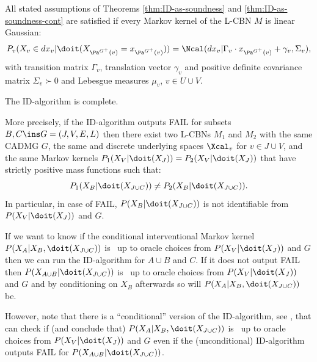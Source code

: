 \begin{Eg}
    All stated assumptions of Theorems \ref{thm:ID-as-soundness} and \ref{thm:ID-as-soundness-cont} 
    are satisfied if every Markov kernel of the L-CBN $M$ is linear Gaussian: 
    \[P_v(X_v \in dx_v|\doit(X_{\Pa^{G^+}(v)}=x_{\Pa^{G^+}(v)})) = \Ncal(dx_v|\Gamma_v \cdot x_{\Pa^{G^+}(v)} + \gamma_v, \Sigma_v), \] 
    with transition matrix $\Gamma_v$, translation vector $\gamma_v$ and positive definite covariance matrix $\Sigma_v \succ 0$ and Lebesgue measures $\mu_v$, $v \in U \cup V$.
\end{Eg}

\begin{Thm} 
    The ID-algorithm is complete.

    More precisely, if the ID-algorithm outputs FAIL for subsets $B, C \ins G=(J,V,E,L)$ 
    then there exist two L-CBNs $M_1$ and $M_2$ with the same \observational CADMG
    $G$, the same and discrete underlying spaces $\Xcal_v$ for $v \in J \cup V$, and the same 
    \observational Markov kernels $P_1(X_V|\doit(X_J)) =P_2(X_V|\doit(X_J))$ that have strictly positive mass functions such that:
    \[ P_1(X_B|\doit(X_{J \cup C})) \neq P_2(X_B|\doit(X_{J \cup C})). \]
    In particular, in case of FAIL, $P(X_B|\doit(X_{J \cup C}))$ is not identifiable from $P(X_V|\doit(X_J))$ and $G$.
\end{Thm}


\begin{Rem} 
    If we want to know if the conditional interventional Markov kernel $P(X_A|X_B,\doit(X_{J \cup C}))$
    is \trackable\ up to oracle choices from $P(X_V|\doit(X_J))$ and $G$ then we can run the ID-algorithm
    for $A \cup B$ and $C$. If it does not output FAIL then $P(X_{A \cup B}|\doit(X_{J \cup C}))$ 
    is \trackable\ up to oracle choices from $P(X_V|\doit(X_J))$ and $G$ and by conditioning on $X_B$ afterwards so will 
    $P(X_A|X_B,\doit(X_{J \cup C}))$ be.

    However, note that there is a ``conditional'' version of the ID-algorithm, see \cite{Tian04s}, 
    that can check if (and conclude that)
    $P(X_A|X_B,\doit(X_{J \cup C}))$ is \trackable\ up to oracle choices from $P(X_V|\doit(X_J))$ and $G$ 
    even if the (unconditional) ID-algorithm outputs FAIL for $P(X_{A \cup B}|\doit(X_{J \cup C}))$.
\end{Rem}

